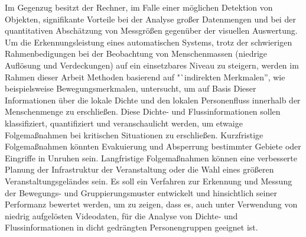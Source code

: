 Im Gegenzug besitzt der Rechner, im Falle einer möglichen Detektion von Objekten, signifikante Vorteile bei der Analyse großer Datenmengen und bei der quantitativen Abschätzung von Messgrößen gegenüber der visuellen Auswertung. Um die Erkennungsleistung eines automatischen Systems, trotz der schwierigen Rahmenbedigungen bei der Beobachtung von Menschenmassen (niedrige Auflösung und Verdeckungen) auf ein einsetzbares Niveau zu steigern, werden im Rahmen dieser Arbeit Methoden basierend auf "`indirekten Merkmalen'', wie beispielsweise Bewegungsmerkmalen, untersucht, um auf Basis Dieser Informationen über die lokale Dichte und den lokalen Personenfluss innerhalb der Menschenmenge zu erschließen. Diese Dichte- und Flussinformationen sollen klassifiziert, quantifiziert und veranschaulicht werden, um etwaige Folgemaßnahmen bei kritischen Situationen zu erschließen. 
\newpage
Kurzfristige Folgemaßnahmen könnten \zb Evakuierung und Absperrung bestimmter Gebiete oder Eingriffe in Unruhen sein. Langfristige Folgemaßnahmen können \zb eine verbesserte Planung der Infrastruktur der Veranstaltung oder die Wahl eines größeren Veranstaltungsgeländes sein. Es soll ein Verfahren zur Erkennung und Messung der Bewegungs- und Gruppierungsmuster entwickelt und hinsichtlich seiner Performanz bewertet werden, um zu zeigen, dass es, auch unter Verwendung von niedrig aufgelösten Videodaten, für die Analyse von Dichte- und Flussinformationen in dicht gedrängten Personengruppen geeignet ist.
